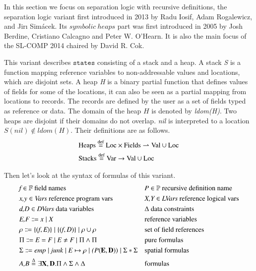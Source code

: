 \documentclass{article}
\theoremstyle{plain}
\begin{document}
In this section we focus on separation logic with recursive definitions, the separation logic variant first introduced in 2013 by Radu Iosif, Adam Rogalewicz, and Jirı Simácek. Its $symbolic\ heaps$ part was first introduced in 2005 by Josh Berdine, Cristiano Calcagno and Peter W. O'Hearn. It is also the main focus of the SL-COMP 2014 chaired by David R. Cok.

This variant describes $\mathtt{states}$ consisting of a stack and a heap. A stack \textit{S} is a function mapping reference variables to non-addressable values and locations, which are disjoint sets. A heap \textit{H} is a binary partial function that defines values of fields for some of the locations, it can also be seen as a partial mapping from locations to records. The records are defined by the user as a set of fields typed as reference or data. The domain of the heap $H$ is denoted by \textit{ldom(H)}. Two heaps are disjoint if their domains do not overlap. \textit{nil} is interpreted to a location $\mathit{S(nil) \notin ldom(H)}$. Their definitions are as follows.
\begin{equation*}
\begin{split}
& \mathrm{Heaps \buildrel \text{d{}ef}\over= Loc \times Fields \rightharpoonup Val\cup Loc} \\
& \mathrm{Stacks \buildrel \text{d{}ef}\over= Var \to Val \cup Loc}
\end{split}
\end{equation*}

Then let's look at the syntax of formulas of this variant.
\begin{align*}
&\emph{f} \in \mathbb{F} \ \text{field names} & &\emph{P} \in \mathbb{P} \ \text{recursive definition name}\\
&\emph{x,y} \in \emph{Vars} \ \text{reference program vars}& &\emph{X,Y} \in \emph{LVars} \ \text{reference logical vars}\\
&\emph{d,D} \in \emph{DVars} \ \text{data\ variables}& &\Delta \ \text{data constraints}\\
&\emph{E,F} \Coloneqq \emph{x} \mid \emph{X} & &\text{reference  variables}\\
&\rho \Coloneqq \{(\emph{f},\emph{E})\} \mid \{(\emph{f},\emph{D})\}  \mid \rho\cup \rho & &\text{set of field references}\\
&\Pi \Coloneqq \emph{E}=\emph{F} \mid\emph{E}\ne\emph{F}  \mid \Pi \wedge  \Pi & &\text{pure formulas}\\
&\Sigma \Coloneqq \emph{emp} \mid \emph{junk} \mid \emph{E} \mapsto \rho \mid \emph(P(\mathbf{E},\mathbf{D})) \mid \Sigma *\Sigma & &\text{spatial formulas}\\
&\emph{A,B} \overset{\Delta}{=} \exists \mathbf{X},\mathbf{D}. \Pi \wedge  \Sigma  \wedge  \Delta & &\text{formulas}\\
\end{align*}
\end{document}
